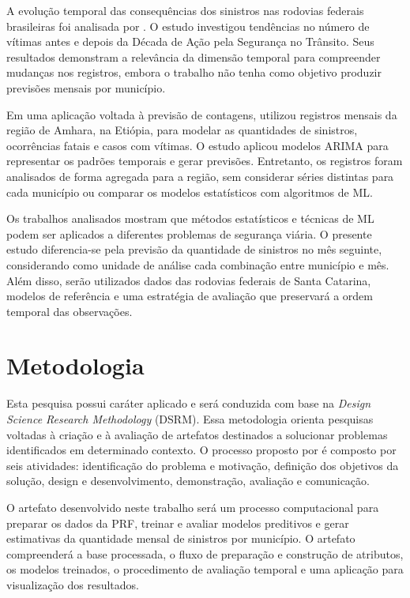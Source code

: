 \documentclass[12pt]{article}
\begin{document}
A evolução temporal das consequências dos sinistros nas rodovias federais brasileiras foi analisada por \cite{moraisneto2021tendencia}. O estudo investigou tendências no número de vítimas antes e depois da Década de Ação pela Segurança no Trânsito. Seus resultados demonstram a relevância da dimensão temporal para compreender mudanças nos registros, embora o trabalho não tenha como objetivo produzir previsões mensais por município.

Em uma aplicação voltada à previsão de contagens, \cite{getahun2021timeseries} utilizou registros mensais da região de Amhara, na Etiópia, para modelar as quantidades de sinistros, ocorrências fatais e casos com vítimas. O estudo aplicou modelos ARIMA para representar os padrões temporais e gerar previsões. Entretanto, os registros foram analisados de forma agregada para a região, sem considerar séries distintas para cada município ou comparar os modelos estatísticos com algoritmos de ML.

Os trabalhos analisados mostram que métodos estatísticos e técnicas de ML podem ser aplicados a diferentes problemas de segurança viária. O presente estudo diferencia-se pela previsão da quantidade de sinistros no mês seguinte, considerando como unidade de análise cada combinação entre município e mês. Além disso, serão utilizados dados das rodovias federais de Santa Catarina, modelos de referência e uma estratégia de avaliação que preservará a ordem temporal das observações.

\section{Metodologia}

Esta pesquisa possui caráter aplicado e será conduzida com base na \textit{Design Science Research Methodology} (DSRM). Essa metodologia orienta pesquisas voltadas à criação e à avaliação de artefatos destinados a solucionar problemas identificados em determinado contexto. O processo proposto por \cite{peffers2007dsrm} é composto por seis atividades: identificação do problema e motivação, definição dos objetivos da solução, design e desenvolvimento, demonstração, avaliação e comunicação.

O artefato desenvolvido neste trabalho será um processo computacional para preparar os dados da PRF, treinar e avaliar modelos preditivos e gerar estimativas da quantidade mensal de sinistros por município. O artefato compreenderá a base processada, o fluxo de preparação e construção de atributos, os modelos treinados, o procedimento de avaliação temporal e uma aplicação para visualização dos resultados.
\end{document}
